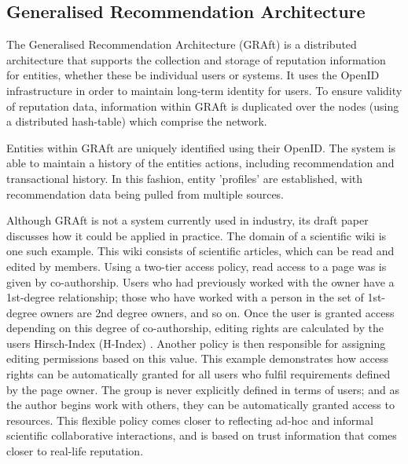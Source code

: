 
\subsection{Generalised Recommendation Architecture}

The Generalised Recommendation Architecture (GRAft) \cite{} is a distributed architecture that supports the collection and storage of reputation information for entities, whether these be individual users or systems. It uses the OpenID \cite{} infrastructure in order to maintain long-term identity for users. To ensure validity of reputation data, information within GRAft is duplicated over the nodes (using a distributed hash-table) which comprise the network. 

Entities within GRAft are uniquely identified using their OpenID. The system is able to maintain a history of the entities actions, including recommendation and transactional history. In this fashion, entity 'profiles' are established, with recommendation data being pulled from multiple sources.



Although GRAft is not a system currently used in industry, its draft paper discusses how it could be applied in practice. The domain of a scientific wiki is one such example. This wiki consists of scientific articles, which can be read and edited by members. Using a two-tier access policy, read access to a page was is given by co-authorship. Users who had previously worked with the owner have a 1st-degree relationship; those who have worked with a person in the set of 1st-degree owners are 2nd degree owners, and so on. Once the user is granted access depending on this degree of co-authorship, editing rights are calculated by the users Hirsch-Index (H-Index) \cite{}. Another policy is then responsible for assigning editing permissions based on this value. This example demonstrates how access rights can be automatically granted for all users who fulfil requirements defined by the page owner. The group is never explicitly defined in terms of users; and as the author begins work with others, they can be 
automatically granted access to resources. This flexible policy comes closer to reflecting ad-hoc and informal scientific collaborative interactions, and is based on trust information that comes closer to real-life reputation. 

